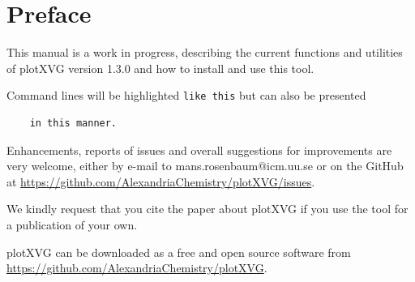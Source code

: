 \section*{Preface}
This manual is a work in progress, describing the current functions and utilities of plotXVG version 1.3.0 and how to install and use this tool.

Command lines will be highlighted \texttt{like this} but can also be presented
\begin{verbatim}
    in this manner.
\end{verbatim}
Enhancements, reports of issues and overall suggestions for improvements are very welcome, either by e-mail to mans.rosenbaum@icm.uu.se or on the GitHub at \href{https://github.com/AlexandriaChemistry/plotXVG/issues}{https://github.com/AlexandriaChemistry/plotXVG/issues}.

We kindly request that you cite the paper about plotXVG if you use the tool for a publication of your own.

plotXVG can be downloaded as a free and open source software from \\
\href{https://github.com/AlexandriaChemistry/plotXVG}{https://github.com/AlexandriaChemistry/plotXVG}.

